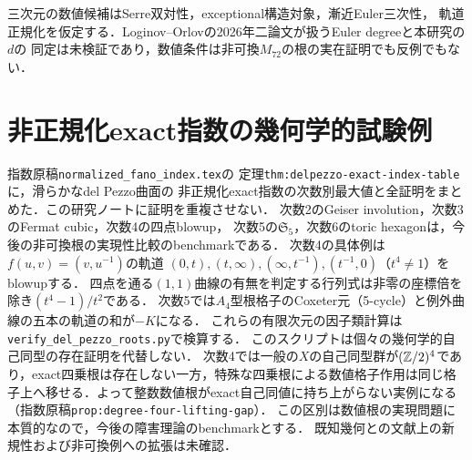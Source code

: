 \documentclass[11pt,a4paper]{ltjsarticle}
\begin{document}
三次元の数値候補はSerre双対性，exceptional構造対象，漸近Euler三次性，
軌道正規化を仮定する．Loginov--Orlovの2026年二論文が扱うEuler degreeと本研究の$d$の
同定は未検証であり，数値条件は非可換$M_{72}$の根の実在証明でも反例でもない．

\section{非正規化exact指数の幾何学的試験例}
指数原稿\texttt{normalized\_fano\_index.tex}の
定理\texttt{thm:delpezzo-exact-index-table}に，滑らかなdel Pezzo曲面の
非正規化exact指数の次数別最大値と全証明をまとめた．この研究ノートに証明を重複させない．
次数2のGeiser involution，次数3のFermat cubic，次数4の四点blowup，
次数5の$\mathfrak S_5$，次数6のtoric hexagonは，今後の非可換根の実現性比較のbenchmarkである．
次数4の具体例は$f(u,v)=(v,u^{-1})$の軌道
$(0,t),(t,\infty),(\infty,t^{-1}),(t^{-1},0)$（$t^4\ne1$）をblowupする．
四点を通る$(1,1)$曲線の有無を判定する行列式は非零の座標倍を除き$(t^4-1)/t^2$である．
次数5では$A_4$型根格子のCoxeter元（5-cycle）と例外曲線の五本の軌道の和が$-K$になる．
これらの有限次元の因子類計算は\texttt{verify\_del\_pezzo\_roots.py}で検算する．
このスクリプトは個々の幾何学的自己同型の存在証明を代替しない．
次数4では一般の$X$の自己同型群が$(\mathbb Z/2)^4$であり，exact四乗根は存在しない一方，特殊な四乗根による数値格子作用は同じ格子上へ移せる．よって整数数値根がexact自己同値に持ち上がらない実例になる（指数原稿\texttt{prop:degree-four-lifting-gap}）．
この区別は数値根の実現問題に本質的なので，今後の障害理論のbenchmarkとする．
既知幾何との文献上の新規性および非可換例への拡張は未確認．
\end{document}
